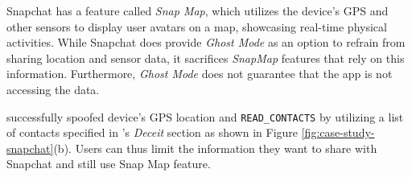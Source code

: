 
Snapchat has a feature called 
\textit{Snap Map}, which utilizes the device's GPS and other sensors to
display user avatars on a map, showcasing real-time physical activities. 
While Snapchat does provide \textit{Ghost Mode} as
an option to refrain from sharing location and sensor data, it sacrifices
\textit{SnapMap} features that rely on this information. Furthermore,
\textit{Ghost Mode} does not guarantee that the app is not accessing the data. 


\framework successfully spoofed device's GPS location and
\texttt{READ\_CONTACTS} by utilizing a list of contacts specified in
\framework's \textit{Deceit} section as shown in Figure
\ref{fig:case-study-snapchat}(b). Users can thus limit the information 
they want to share with Snapchat and still use Snap Map feature.

